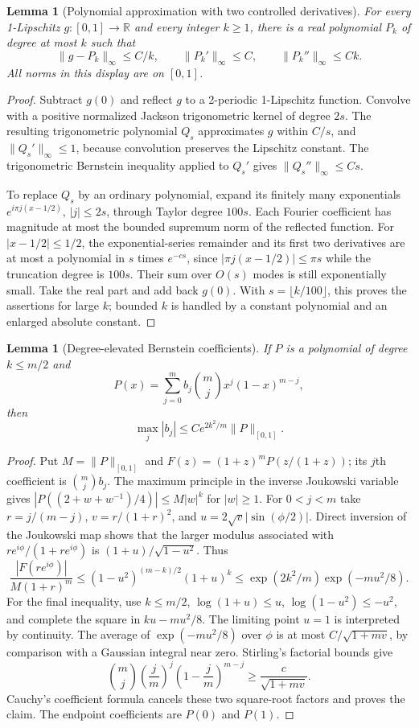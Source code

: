 \documentclass[11pt,a4paper]{article}
\newtheorem{lemma}[theorem]{Lemma}
\theoremstyle{definition}
\theoremstyle{remark}
\numberwithin{equation}{section}
\begin{document}
\begin{lemma}[Polynomial approximation with two controlled derivatives]
\label{p6:gf:poly}
For every 1-Lipschitz $g:[0,1]\to\mathbb R$ and every integer
$k\ge1$, there is a real polynomial $P_k$ of degree at most $k$
such that
\[
 \|g-P_k\|_\infty\le C/k,\qquad
 \|P_k'\|_\infty\le C,\qquad
 \|P_k''\|_\infty\le Ck.
\]
All norms in this display are on $[0,1]$.
\end{lemma}
\begin{proof}
Subtract $g(0)$ and reflect $g$ to a 2-periodic 1-Lipschitz function.
Convolve with a positive normalized Jackson trigonometric kernel
of degree $2s$.  The resulting trigonometric polynomial $Q_s$
approximates $g$ within $C/s$, and $\|Q_s'\|_\infty\le1$,
because convolution preserves the Lipschitz constant.  The
trigonometric Bernstein inequality applied to $Q_s'$ gives
$\|Q_s''\|_\infty\le Cs$.

To replace $Q_s$ by an ordinary polynomial, expand its finitely
many exponentials $e^{i\pi j(x-1/2)}$, $|j|\le2s$, through
Taylor degree $100s$.  Each Fourier coefficient has magnitude
at most the bounded supremum norm of the reflected function.
For $|x-1/2|\le1/2$, the exponential-series remainder and its first
two derivatives are at most a polynomial in $s$ times $e^{-cs}$,
since $|\pi j(x-1/2)|\le\pi s$ while the truncation degree is
$100s$.  Their sum over $O(s)$ modes is still exponentially small.
Take the real part and add back $g(0)$.  With
$s=\lfloor k/100\rfloor$, this proves the assertions for large
$k$; bounded $k$ is handled by a constant polynomial and an enlarged
absolute constant.
\end{proof}

\begin{lemma}[Degree-elevated Bernstein coefficients]\label{p6:gf:bernstein}
If $P$ is a polynomial of degree $k\le m/2$ and
\[
 P(x)=\sum_{j=0}^m b_j\binom mj x^j(1-x)^{m-j},
\]
then
\[
                  \max_j|b_j|\le Ce^{2k^2/m}\|P\|_{[0,1]}.
\]
\end{lemma}
\begin{proof}
Put $M=\|P\|_{[0,1]}$ and
$F(z)=(1+z)^mP(z/(1+z))$; its $j$th coefficient is
$\binom mj b_j$.  The maximum principle in the inverse Joukowski
variable gives
$|P((2+w+w^{-1})/4)|\le M|w|^k$ for $|w|\ge1$.
For $0<j<m$ take $r=j/(m-j)$, $v=r/(1+r)^2$, and
$u=2\sqrt v|\sin(\phi/2)|$.  Direct inversion of the Joukowski
map shows that the larger modulus associated with
$re^{i\phi}/(1+re^{i\phi})$ is
$(1+u)/\sqrt{1-u^2}$.  Thus
\[
 \frac{|F(re^{i\phi})|}{M(1+r)^m}
 \le(1-u^2)^{(m-k)/2}(1+u)^k
 \le\exp(2k^2/m)\exp(-mu^2/8).
\]
For the final inequality, use $k\le m/2$, $\log(1+u)\le u$,
$\log(1-u^2)\le-u^2$, and complete the square in
$ku-mu^2/8$.  The limiting point $u=1$ is interpreted by continuity.
The average of $\exp(-mu^2/8)$ over $\phi$ is at most
$C/\sqrt{1+mv}$, by comparison with a Gaussian integral near zero.
Stirling's factorial bounds give
\[
 \binom mj\left(\frac jm\right)^j
          \left(1-\frac jm\right)^{m-j}
                         \ge\frac c{\sqrt{1+mv}}.
\]
Cauchy's coefficient formula cancels these two square-root factors
and proves the claim.  The endpoint coefficients are $P(0)$ and
$P(1)$.
\end{proof}
\end{document}

